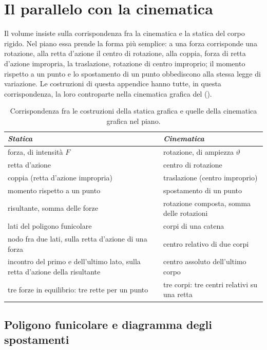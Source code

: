 \section{Il parallelo con la cinematica}
\label{sec:dualita_sgr}

Il volume insiste sulla corrispondenza fra la cinematica e la statica del corpo rigido. Nel piano
essa prende la forma più semplice: a una forza corrisponde una rotazione, alla retta d'azione il
centro di rotazione, alla coppia, forza di retta d'azione impropria, la traslazione, rotazione di
centro improprio; il momento rispetto a un punto e lo spostamento di un punto obbediscono alla
stessa legge di variazione. Le costruzioni di questa appendice hanno tutte, in questa
corrispondenza, la loro controparte nella cinematica grafica del
 ().

\begin{table}[htbp]
	\centering
	\caption{Corrispondenza fra le costruzioni della statica grafica e quelle della cinematica
		grafica nel piano.}
	\label{tab:dualita_sgr}
	\begin{tabular}{p{}p{}}
		\hline
		\emph{Statica} & \emph{Cinematica} \\
		\hline
		forza, di intensità $F$ & rotazione, di ampiezza $\vartheta$ \\
		retta d'azione & centro di rotazione \\
		coppia (retta d'azione impropria) & traslazione (centro improprio) \\
		momento rispetto a un punto & spostamento di un punto \\
		risultante, somma delle forze & rotazione composta, somma delle rotazioni \\
		lati del poligono funicolare & corpi di una catena \\
		nodo fra due lati, sulla retta d'azione di una forza & centro relativo di due corpi \\
		incontro del primo e dell'ultimo lato, sulla retta d'azione della risultante &
		centro assoluto dell'ultimo corpo \\
		tre forze in equilibrio: tre rette per un punto & tre corpi: tre centri relativi su una retta \\
		\hline
	\end{tabular}
\end{table}

\subsection{Poligono funicolare e diagramma degli spostamenti}
\label{sec:spostamenti_sgr}

